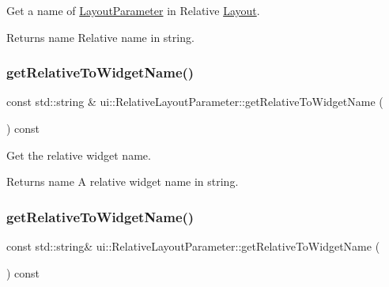 Get a name of \hyperlink{classui_1_1LayoutParameter}{Layout\+Parameter} in Relative \hyperlink{classui_1_1Layout}{Layout}.

\begin{DoxyReturn}{Returns}
name Relative name in string. 
\end{DoxyReturn}
\mbox{\label{classui_1_1RelativeLayoutParameter_aca4e12f2edd43375f8af9c528270f8e3}} 
\subsubsection{\texorpdfstring{get\+Relative\+To\+Widget\+Name()}{getRelativeToWidgetName()}\hspace{0.1cm}{\footnotesize\ttfamily [1/2]}}
{\footnotesize\ttfamily const std\+::string \& ui\+::\+Relative\+Layout\+Parameter\+::get\+Relative\+To\+Widget\+Name (\begin{DoxyParamCaption}{ }\end{DoxyParamCaption}) const}

Get the relative widget name. \begin{DoxyReturn}{Returns}
name A relative widget name in string. 
\end{DoxyReturn}
\mbox{\label{classui_1_1RelativeLayoutParameter_a5519af0b68eb3cf47febaa910c7aa57e}} 
\subsubsection{\texorpdfstring{get\+Relative\+To\+Widget\+Name()}{getRelativeToWidgetName()}\hspace{0.1cm}{\footnotesize\ttfamily [2/2]}}
{\footnotesize\ttfamily const std\+::string\& ui\+::\+Relative\+Layout\+Parameter\+::get\+Relative\+To\+Widget\+Name (\begin{DoxyParamCaption}{ }\end{DoxyParamCaption}) const}

